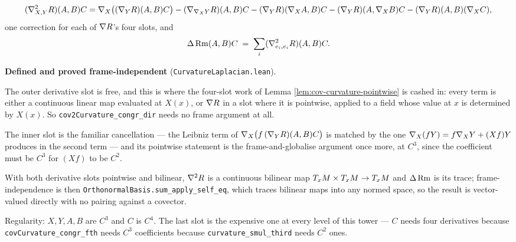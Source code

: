 \begin{definition}
  \label{def:cov2-curvature}
  \leanok
  \[
    (\nabla^2_{X,Y}R)(A,B)C
      = \nabla_X\big((\nabla_YR)(A,B)C\big)
        - (\nabla_{\nabla_X Y}R)(A,B)C
        - (\nabla_YR)(\nabla_X A,B)C
        - (\nabla_YR)(A,\nabla_X B)C
        - (\nabla_YR)(A,B)(\nabla_X C),
  \]
  one correction for each of $\nabla R$'s four slots, and
  \[
    \Delta\operatorname{Rm}(A,B)C \;=\; \sum_i (\nabla^2_{e_i,e_i}R)(A,B)C .
  \]

  \textbf{Defined and proved frame-independent} (\texttt{CurvatureLaplacian.lean}).

  The outer derivative slot is free, and this is where the four-slot work of
  Lemma \ref{lem:cov-curvature-pointwise} is cashed in: every term is either a
  continuous linear map evaluated at $X(x)$, or $\nabla R$ in a slot where it
  is pointwise, applied to a field whose value at $x$ is determined by $X(x)$.
  So \texttt{cov2Curvature\_congr\_dir} needs no frame argument at all.

  The inner slot is the familiar cancellation --- the Leibniz term of
  $\nabla_X\big(f\,(\nabla_YR)(A,B)C\big)$ is matched by the one
  $\nabla_X(fY) = f\nabla_X Y + (Xf)Y$ produces in the second term --- and its
  pointwise statement is the frame-and-globalise argument once more, at $C^3$,
  since the coefficient must be $C^3$ for $(Xf)$ to be $C^2$.

  With both derivative slots pointwise and bilinear, $\nabla^2R$ is a
  continuous bilinear map $T_xM \times T_xM \to T_xM$ and $\Delta\operatorname{Rm}$ is its
  trace; frame-independence is then \texttt{OrthonormalBasis.sum\_apply\_self\_eq},
  which traces bilinear maps into any normed space, so the result is
  vector-valued directly with no pairing against a covector.

  Regularity: $X, Y, A, B$ are $C^3$ and $C$ is $C^4$. The last slot is the
  expensive one at every level of this tower --- $C$ needs four derivatives
  because \texttt{covCurvature\_congr\_fth} needs $C^3$ coefficients because
  \texttt{curvature\_smul\_third} needs $C^2$ ones.


\end{definition}

